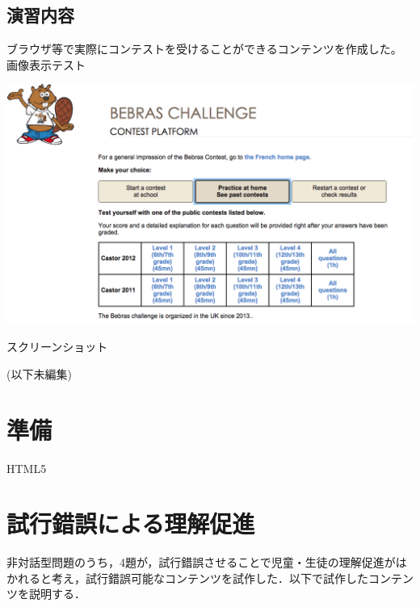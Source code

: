 \documentclass[a4paper]{jarticle}
\makeatletter
\newenvironment{figurehere}
  {\def\@captype{figure}}
  {}
\makeatother
\begin{document}
\begin{multicols}{2}
\subsection{演習内容}
ブラウザ等で実際にコンテストを受けることができるコンテンツを作成した。\\
画像表示テスト\\
\begin{figurehere}
\begin{center}
	\includegraphics[bb=400 0 650 633,scale= 0.25]{img/bebras-test-form.png}\\
\end{center}
	\caption{スクリーンショット}\label{fig:1}
\end{figurehere}

(以下未編集)\\

\section{準備}

\begin{description}
\item[HTML5]  
\end{description}

\section{試行錯誤による理解促進}
非対話型問題のうち，4題が，試行錯誤させることで児童・生徒の理解促進がはかれると考え，試行錯誤可能なコンテンツを試作した．以下で試作したコンテンツを説明する．


\end{multicols}
\end{document}
